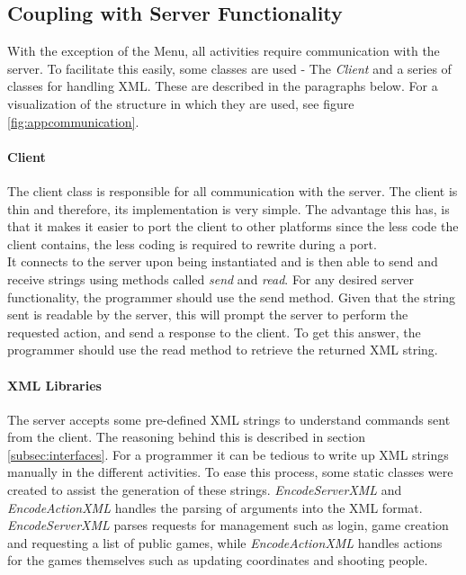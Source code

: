 \subsection{Coupling with Server Functionality} \label{subsec:server-coupling}
With the exception of the Menu, all activities require communication with the server. To facilitate this easily, some classes are used - The \textit{Client} and a series of classes for handling XML. These are described in the paragraphs below. For a visualization of the structure in which they are used, see figure \ref{fig:appcommunication}.

\paragraph{Client}
The client class is responsible for all communication with the server. The client is thin and therefore, its implementation is very simple. The advantage this has, is that it makes it easier to port the client to other platforms since the less code the client contains, the less coding is required to rewrite during a port.\\

It connects to the server upon being instantiated and is then able to send and receive strings using methods called \textit{send} and \textit{read}. For any desired server functionality, the programmer should use the send method. Given that the string sent is readable by the server, this will prompt the server to perform the requested action, and send a response to the client. To get this answer, the programmer should use the read method to retrieve the returned XML string.

\paragraph{XML Libraries}
The server accepts some pre-defined XML strings to understand commands sent from the client. The reasoning behind this is described in section \ref{subsec:interfaces}. For a programmer it can be tedious to write up XML strings manually in the different activities. To ease this process, some static classes were created to assist the generation of these strings. \textit{EncodeServerXML} and \textit{EncodeActionXML} handles the parsing of arguments into the XML format. \textit{EncodeServerXML} parses requests for management such as login, game creation and requesting a list of public games, while \textit{EncodeActionXML} handles actions for the games themselves such as updating coordinates and shooting people.

